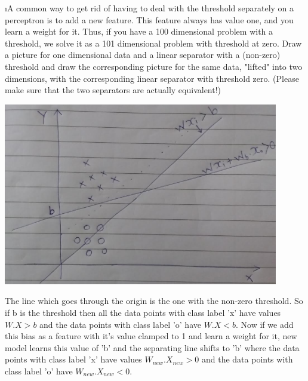 \documentclass[fleqn]{article}
\begin{document}
\i A common way to get rid of having to deal with the threshold separately on a perceptron is to add a
new feature. This feature always has value one, and you learn a weight for it. Thus, if you have a 100
dimensional problem with a threshold, we solve it as a 101 dimensional problem with threshold at zero.
Draw a picture for one dimensional data and a linear separator with a (non-zero) threshold and draw
the corresponding picture for the same data, "lifted" into two dimensions, with the corresponding linear
separator with threshold zero. (Please make sure that the two separators are actually equivalent!)
\begin{solution}
\begin{center}
\includegraphics[width=0.9\textwidth]{graph.png}
\end{center}

The line which goes through the origin is the one with the non-zero threshold. So if b is the threshold then all the data points with class label 'x' have values $W.X > b$ and the data points with class label 'o' have $W.X < b$.
Now if we add this bias as a feature with it's value clamped to 1 and learn a weight for it, new model learns this value of 'b' and the separating line shifts to 'b' where the data points with class label 'x' have values 
$W_{new}.X_{new} > 0$ and the data points with class label 'o' have $W_{new}.X_{new} < 0$.
\end{solution}

\ene
\end{document}
